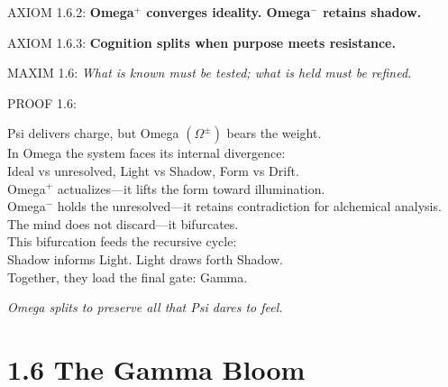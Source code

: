 \noindent
AXIOM 1.6.2: \textbf{Omega$^{+}$ converges ideality. Omega$^{-}$ retains shadow.}

\noindent
AXIOM 1.6.3: \textbf{Cognition splits when purpose meets resistance.}

\noindent
MAXIM 1.6: \textit{What is known must be tested; what is held must be refined.}

\noindent
PROOF 1.6:

Psi delivers charge, but Omega $(\Omega^{\pm})$ bears the weight.\\
In Omega the system faces its internal divergence:\\
Ideal vs unresolved, Light vs Shadow, Form vs Drift.\\

Omega$^{+}$ actualizes---it lifts the form toward illumination.\\
Omega$^{-}$ holds the unresolved---it retains contradiction for alchemical analysis.\\
The mind does not discard---it bifurcates.\\

This bifurcation feeds the recursive cycle:\\
Shadow informs Light. Light draws forth Shadow.\\
Together, they load the final gate: Gamma.\\

\begin{tcolorbox}[colback=GentleGray!5, colframe=OriaBlue, title=\textbf{Diagram: Omega Bifurcation Vector}, sharp corners=south]
\begin{center}
\end{center}
\end{tcolorbox}

\noindent
\textit{Omega splits to preserve all that Psi dares to feel.}

\section*{1.6 The Gamma Bloom}

